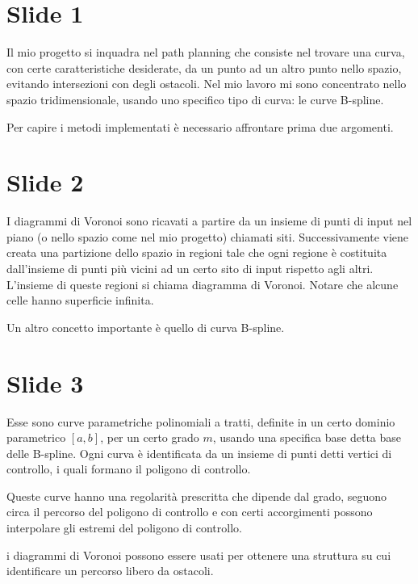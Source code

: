 \documentclass{article}
\begin{document}
\section*{Slide 1}
Il mio progetto si inquadra nel path planning che consiste nel trovare
una curva, con certe caratteristiche desiderate, da un punto ad un
altro punto nello spazio, evitando intersezioni con degli
ostacoli. Nel mio lavoro mi sono concentrato nello spazio
tridimensionale, usando uno specifico tipo di curva: le curve B-spline.

Per capire i metodi
implementati è necessario affrontare prima due argomenti.

\section*{Slide 2}
I diagrammi di Voronoi sono ricavati a partire da un insieme di punti
di input
nel piano (o nello spazio come nel mio progetto) chiamati
siti. Successivamente viene
creata una partizione dello spazio in regioni tale che ogni regione è
costituita dall'insieme di punti più vicini ad un certo sito di input
rispetto agli altri. L'insieme di queste regioni si chiama diagramma
di Voronoi. Notare che alcune celle hanno superficie infinita.

Un altro concetto importante è quello di curva B-spline.

\section*{Slide 3}
Esse sono curve parametriche polinomiali a tratti, definite in un
certo dominio parametrico $[a,b]$, per un certo grado $m$, usando una
specifica base detta base delle B-spline. Ogni curva è identificata da
un insieme di punti detti vertici di controllo, i quali formano il
poligono di controllo.

Queste curve hanno una regolarità prescritta che dipende dal grado,
seguono circa il percorso del poligono di controllo e con certi
accorgimenti possono interpolare gli estremi del poligono di controllo.

i diagrammi di Voronoi possono essere usati per
ottenere una struttura su cui identificare un percorso libero da
ostacoli.
\end{document}
